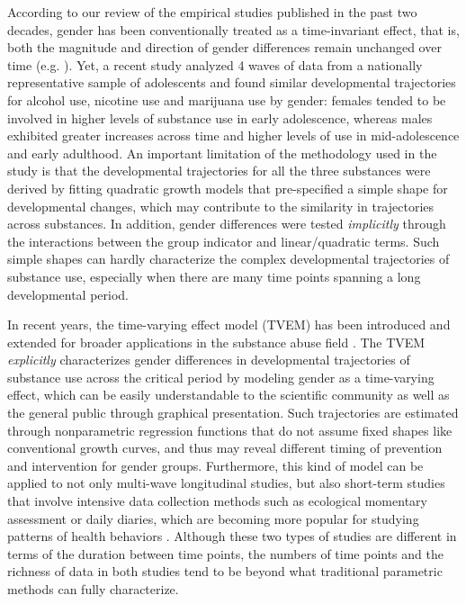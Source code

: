 According to our review of the empirical studies published in the
past two decades, gender has been conventionally treated as a
time-invariant effect, that is, both the magnitude and direction
of gender differences remain unchanged over time (e.g.
\cite{Boden14,smith15}). Yet, a recent study \cite{chen12}
analyzed 4 waves of data from a nationally representative sample
of adolescents and found similar developmental trajectories for
alcohol use, nicotine use and marijuana use by gender: females
tended to be involved in higher levels of substance use in early
adolescence, whereas males exhibited greater increases across time
and higher levels of use in mid-adolescence and early adulthood.
An important limitation of the methodology used in the study is
that the developmental trajectories for all the three substances
were derived by fitting quadratic growth models that pre-specified
a simple shape for developmental changes, which may contribute to
the similarity in trajectories across substances. In addition,
gender differences were tested \emph{implicitly} through the
interactions between the group indicator and linear/quadratic
terms. Such simple shapes can hardly characterize the complex
developmental trajectories of substance use, especially when there
are many time points spanning a long developmental period.

In recent years, the time-varying effect model (TVEM) has been
introduced and extended for broader applications in the substance
abuse field \cite{cai00,dziak14,qu06,tan12,wang09,zhu12}. The TVEM
\emph{explicitly} characterizes gender differences in
developmental trajectories of substance use across the critical
period by modeling gender as a time-varying effect, which can be
easily understandable to the scientific community as well as the
general public through graphical presentation. Such trajectories
are estimated through nonparametric regression functions that do
not assume fixed shapes like conventional growth curves, and thus
may reveal different timing of prevention and intervention for
gender groups. Furthermore, this kind of model can be applied to
not only multi-wave longitudinal studies, but also short-term
studies that involve intensive data collection methods such as
ecological momentary assessment or daily diaries, which are
becoming more popular for studying patterns of health behaviors
\cite{liu13,selya13,vasilenko14,yang15}. Although these two types
of studies are different in terms of the duration between time
points, the numbers of time points and the richness of data in
both studies tend to be beyond what traditional parametric methods
can fully characterize.

